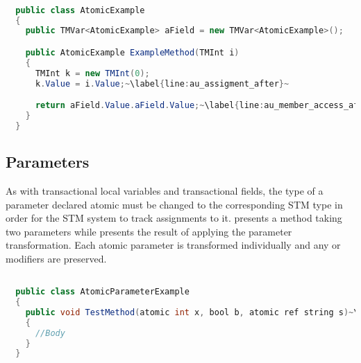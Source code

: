 \begin{lstlisting}[label=lst:after_atomic_usage,
  caption={Usage of \bscode{atomic} Variables After Transformation},
  language=Java,  
  showspaces=false,
  showtabs=false,
  breaklines=true,
  showstringspaces=false,
  breakatwhitespace=true,
  escapechar=~,
  commentstyle=\color{greencomments},
  keywordstyle=\color{bluekeywords},
  stringstyle=\color{redstrings},
  morekeywords={atomic, retry, orelse, var, get, set}]  % Start your code-block

  public class AtomicExample
  {
    public TMVar<AtomicExample> aField = new TMVar<AtomicExample>();

    public AtomicExample ExampleMethod(TMInt i)
    {
      TMInt k = new TMInt(0);
      k.Value = i.Value;~\label{line:au_assigment_after}~

      return aField.Value.aField.Value;~\label{line:au_member_access_after}~
    }
  }
\end{lstlisting}

\subsection{Parameters}
\label{subsec:roslyn_extension_parameters}
As with transactional local variables and transactional fields, the type of a parameter declared atomic must be changed to the corresponding \ac{STM} type in order for the \ac{STM} system to track assignments to it.  presents a method taking two  parameters while  presents the result of applying the parameter transformation. Each atomic parameter is transformed individually and any  or  modifiers are preserved.

\begin{lstlisting}[label=lst:before_atomic_parameter,
  caption={\bscode{atomic} Parameters Before Transformation},
  language=Java,  
  showspaces=false,
  showtabs=false,
  breaklines=true,
  showstringspaces=false,
  breakatwhitespace=true,
  escapechar=~,
  commentstyle=\color{greencomments},
  keywordstyle=\color{bluekeywords},
  stringstyle=\color{redstrings},
  morekeywords={atomic, retry, orelse, var, get, set}]  % Start your code-block

  public class AtomicParameterExample
  {
    public void TestMethod(atomic int x, bool b, atomic ref string s)~\label{line:ap_before}~
    {
      //Body
    }
  }
\end{lstlisting}

